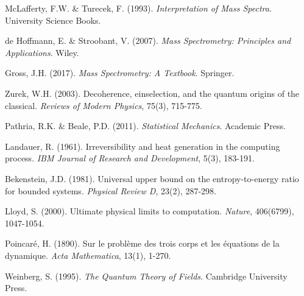\documentclass[11pt,a4paper]{article}
\begin{document}
\begin{thebibliography}{10}

McLafferty, F.W. \& Turecek, F. (1993). \textit{Interpretation of Mass Spectra}. University Science Books.

de Hoffmann, E. \& Stroobant, V. (2007). \textit{Mass Spectrometry: Principles and Applications}. Wiley.

Gross, J.H. (2017). \textit{Mass Spectrometry: A Textbook}. Springer.

Zurek, W.H. (2003). Decoherence, einselection, and the quantum origins of the classical. \textit{Reviews of Modern Physics}, 75(3), 715-775.

Pathria, R.K. \& Beale, P.D. (2011). \textit{Statistical Mechanics}. Academic Press.

Landauer, R. (1961). Irreversibility and heat generation in the computing process. \textit{IBM Journal of Research and Development}, 5(3), 183-191.

Bekenstein, J.D. (1981). Universal upper bound on the entropy-to-energy ratio for bounded systems. \textit{Physical Review D}, 23(2), 287-298.

Lloyd, S. (2000). Ultimate physical limits to computation. \textit{Nature}, 406(6799), 1047-1054.

Poincar\'{e}, H. (1890). Sur le probl\`{e}me des trois corps et les \'{e}quations de la dynamique. \textit{Acta Mathematica}, 13(1), 1-270.

Weinberg, S. (1995). \textit{The Quantum Theory of Fields}. Cambridge University Press.

\end{thebibliography}
\end{document}
